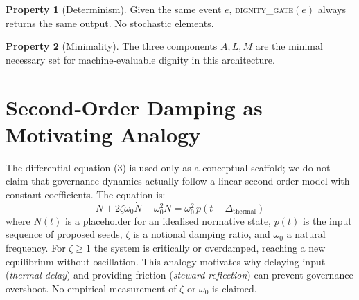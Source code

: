 \documentclass[12pt,a4paper]{article}
\theoremstyle{definition}
\newtheorem{property}{Property}[section]
\theoremstyle{remark}
\newcommand{\dignitygate}{\textsc{dignity\_gate}}
\begin{document}
\begin{property}[Determinism]
Given the same event $e$, \dignitygate{}$(e)$ always returns the same output. No
stochastic elements.
\end{property}

\begin{property}[Minimality]
The three components $A,L,M$ are the minimal necessary set for machine-evaluable
dignity in this architecture.
\end{property}

\section{Second‑Order Damping as Motivating Analogy}
\label{app:damping}

The differential equation (3) is used only as a conceptual scaffold; we do not claim
that governance dynamics actually follow a linear second‑order model with constant
coefficients. The equation is:
\[
\ddot{N} + 2\zeta\omega_0 \dot{N} + \omega_0^2 N = \omega_0^2 \, p(t - \Delta_\text{thermal})
\]
where $N(t)$ is a placeholder for an idealised normative state, $p(t)$ is the input
sequence of proposed seeds, $\zeta$ is a notional damping ratio, and $\omega_0$ a
natural frequency. For $\zeta \ge 1$ the system is critically or overdamped, reaching
a new equilibrium without oscillation. This analogy motivates why delaying input
(\emph{thermal delay}) and providing friction (\emph{steward reflection}) can prevent
governance overshoot. No empirical measurement of $\zeta$ or $\omega_0$ is claimed.
\end{document}
